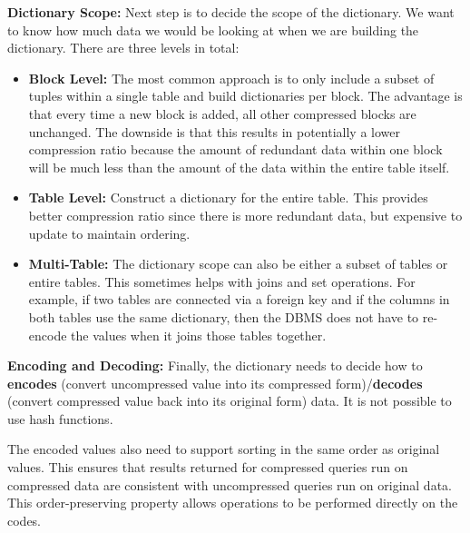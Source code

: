 \documentclass[11pt]{article}
\begin{document}
\textbf{Dictionary Scope:} Next step is to decide the scope of the dictionary. We want to know how much data we would be looking at when we are building the dictionary. There are three levels in total:
\begin{itemize}
    \item \textbf{Block Level:} The most common approach is to only include a subset of tuples within a single table and build dictionaries per block. The advantage is that every time a new block is added, all other compressed blocks are unchanged. The downside is that this results in potentially a lower compression ratio because the amount of redundant data within one block will be much less than the amount of the data within the entire table itself.
    \item \textbf{Table Level:} Construct a dictionary for the entire table. This provides better compression ratio since there is more redundant data, but expensive to update to maintain ordering.
    \item \textbf{Multi-Table:} The dictionary scope can also be either a subset of tables or entire tables. This sometimes helps with joins and set operations. For example, if two tables are connected via a foreign key and if the columns in both tables use the same dictionary, then the DBMS does not have to re-encode the values when it joins those tables together.
\end{itemize}

\textbf{Encoding and Decoding:} Finally, the dictionary needs to decide how to \textbf{encodes} (convert uncompressed value into its compressed form)/\textbf{decodes} (convert compressed value back into its original form) data. It is not possible to use hash functions.

The encoded values also need to support sorting in the same order as original values. This ensures that results returned for compressed queries run on compressed data are consistent with uncompressed queries run on original data. This order-preserving property allows operations to be performed directly on the codes.
\end{document}
